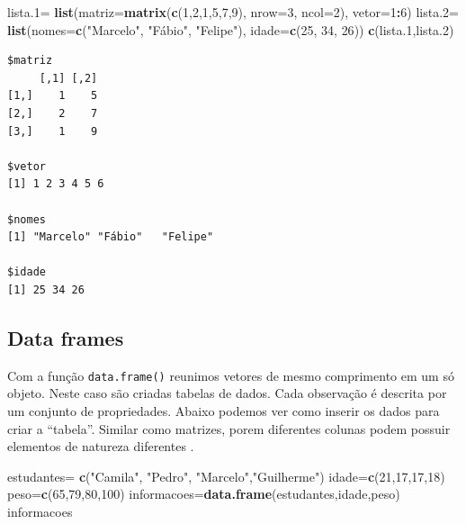 \documentclass[12pt,portuguese,oneside]{book}
\newenvironment{Shaded}{\begin{snugshade}}{\end{snugshade}}
\newcommand{\KeywordTok}[1]{\textcolor[rgb]{0.13,0.29,0.53}{\textbf{#1}}}
\newcommand{\DataTypeTok}[1]{\textcolor[rgb]{0.13,0.29,0.53}{#1}}
\newcommand{\DecValTok}[1]{\textcolor[rgb]{0.00,0.00,0.81}{#1}}
\newcommand{\StringTok}[1]{\textcolor[rgb]{0.31,0.60,0.02}{#1}}
\newcommand{\OperatorTok}[1]{\textcolor[rgb]{0.81,0.36,0.00}{\textbf{#1}}}
\newcommand{\NormalTok}[1]{#1}
\begin{document}
\begin{Shaded}
\begin{Highlighting}[]
\NormalTok{lista.}\DecValTok{1}\NormalTok{=}\StringTok{ }\KeywordTok{list}\NormalTok{(}\DataTypeTok{matriz=}\KeywordTok{matrix}\NormalTok{(}\KeywordTok{c}\NormalTok{(}\DecValTok{1}\NormalTok{,}\DecValTok{2}\NormalTok{,}\DecValTok{1}\NormalTok{,}\DecValTok{5}\NormalTok{,}\DecValTok{7}\NormalTok{,}\DecValTok{9}\NormalTok{), }\DataTypeTok{nrow=}\DecValTok{3}\NormalTok{, }\DataTypeTok{ncol=}\DecValTok{2}\NormalTok{),}
              \DataTypeTok{vetor=}\DecValTok{1}\OperatorTok{:}\DecValTok{6}\NormalTok{)}
\NormalTok{lista.}\DecValTok{2}\NormalTok{=}\StringTok{ }\KeywordTok{list}\NormalTok{(}\DataTypeTok{nomes=}\KeywordTok{c}\NormalTok{(}\StringTok{"Marcelo"}\NormalTok{, }\StringTok{"Fábio"}\NormalTok{, }\StringTok{"Felipe"}\NormalTok{), }
              \DataTypeTok{idade=}\KeywordTok{c}\NormalTok{(}\DecValTok{25}\NormalTok{, }\DecValTok{34}\NormalTok{, }\DecValTok{26}\NormalTok{))}
\KeywordTok{c}\NormalTok{(lista.}\DecValTok{1}\NormalTok{,lista.}\DecValTok{2}\NormalTok{)}
\end{Highlighting}
\end{Shaded}

\begin{verbatim}
$matriz
     [,1] [,2]
[1,]    1    5
[2,]    2    7
[3,]    1    9

$vetor
[1] 1 2 3 4 5 6

$nomes
[1] "Marcelo" "Fábio"   "Felipe" 

$idade
[1] 25 34 26
\end{verbatim}

\subsection{Data frames}\label{data-frames}

Com a função \texttt{data.frame()} reunimos vetores de mesmo comprimento
em um só objeto. Neste caso são criadas tabelas de dados. Cada
observação é descrita por um conjunto de propriedades. Abaixo podemos
ver como inserir os dados para criar a ``tabela''. Similar como
matrizes, porem diferentes colunas podem possuir elementos de natureza
diferentes .

\begin{Shaded}
\begin{Highlighting}[]
\NormalTok{estudantes=}\StringTok{ }\KeywordTok{c}\NormalTok{(}\StringTok{"Camila"}\NormalTok{, }\StringTok{"Pedro"}\NormalTok{, }\StringTok{"Marcelo"}\NormalTok{,}\StringTok{"Guilherme"}\NormalTok{)}
\NormalTok{idade=}\KeywordTok{c}\NormalTok{(}\DecValTok{21}\NormalTok{,}\DecValTok{17}\NormalTok{,}\DecValTok{17}\NormalTok{,}\DecValTok{18}\NormalTok{)}
\NormalTok{peso=}\KeywordTok{c}\NormalTok{(}\DecValTok{65}\NormalTok{,}\DecValTok{79}\NormalTok{,}\DecValTok{80}\NormalTok{,}\DecValTok{100}\NormalTok{)}
\NormalTok{informacoes=}\KeywordTok{data.frame}\NormalTok{(estudantes,idade,peso)}
\NormalTok{informacoes}
\end{Highlighting}
\end{Shaded}
\end{document}
